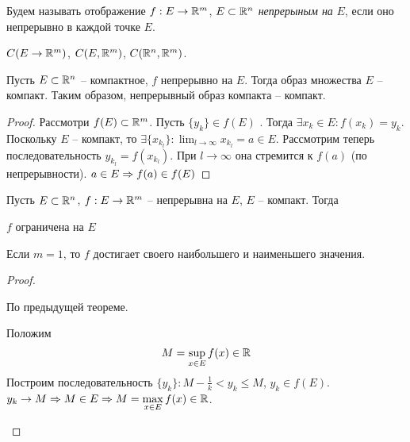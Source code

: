     \begin{Def}
        Будем называть отображение $f : E \to \mathbb{R}^m$, $E \subset \mathbb{R}^n$ \textit{непрерыным на } $E$, если оно непрерывно в каждой точке $E$. 
    \end{Def}

    \begin{notation}
        $C(E \to \mathbb{R}^m)$, $C(E, \mathbb{R}^m)$, $C(\mathbb{R}^n, \mathbb{R}^m)$.
    \end{notation}

    \begin{Thm}
        Пусть $E \subset \mathbb{R}^n$ -- компактное, $f$ непрерывно на $E$.
        Тогда образ множества $E$ -- компакт.
        Таким образом, непрерывный образ компакта -- компакт.
    \end{Thm}

    \begin{proof}
        Рассмотри $f(E) \subset \mathbb{R}^m$. Пусть $\{y_k\} \in f(E)$ .
        Тогда $\exists x_k \in E : f(x_k) = y_k$. Поскольку $E$ -- компакт, то $\exists \{x_{k_l}\} : \lim_{l \to \infty} x_{k_l} = a \in E$.
        Рассмотрим теперь последовательность $y_{k_l} = f(x_{k_l})$. При $l \to \infty$ она стремится к $f(a)$ (по непрерывности). $a \in E \Rightarrow f(a) \in f(E)$ 
    \end{proof}

    \begin{Thm}[Вейерштрасса]
        Пусть $E \subset \mathbb{R}^n$, $f : E \to \mathbb{R}^m$ -- непрерывна на $E$, $E$ -- компакт.
        Тогда 
        \begin{MyList}
            \item $f$ ограничена на $E$
            \item Если $m = 1$, то $f$ достигает своего наибольшего и наименьшего значения.
        \end{MyList}
    \end{Thm}

    \begin{proof}
        \begin{MyList}
            \item По предыдущей теореме.
            \item Положим
            \[M = \sup_{x \in E} f(x) \in \mathbb{R}\]
            Построим последовательность $\{y_k\} : M - \frac{1}{k} < y_k \leqslant M$, $y_k \in f(E)$.
            $y_k \to M \Rightarrow M \in E \Rightarrow M = \displaystyle \max_{x \in E} f(x) \in \mathbb{R}$.
        \end{MyList}
    \end{proof}

